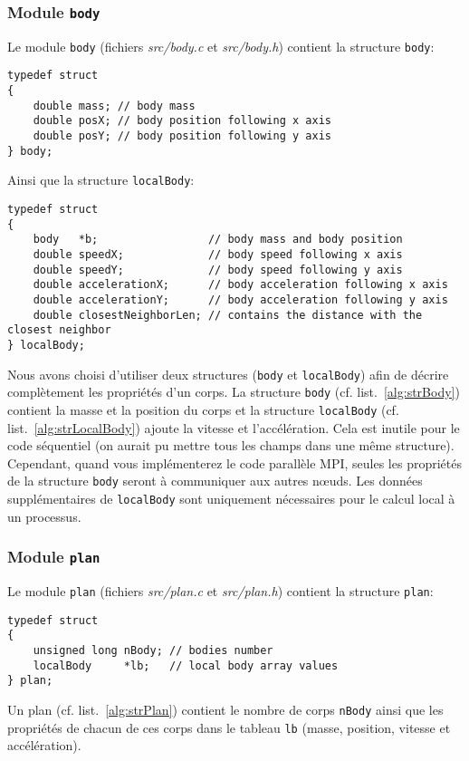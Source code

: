 \subsubsection{Module \texttt{body}}
Le module \texttt{body} (fichiers \textit{src/body.c} et \textit{src/body.h}) contient la structure \texttt{body}:
\begin{lstlisting}[caption={Structure \texttt{body}},label={alg:strBody}]
typedef struct 
{
	double mass; // body mass
	double posX; // body position following x axis
	double posY; // body position following y axis
} body;
\end{lstlisting}
Ainsi que la structure \texttt{localBody}:
\begin{lstlisting}[caption={Structure \texttt{localBody}},label={alg:strLocalBody}]
typedef struct 
{
	body   *b;                 // body mass and body position
	double speedX;             // body speed following x axis
	double speedY;             // body speed following y axis
	double accelerationX;      // body acceleration following x axis
	double accelerationY;      // body acceleration following y axis
	double closestNeighborLen; // contains the distance with the closest neighbor
} localBody;
\end{lstlisting}
Nous avons choisi d'utiliser deux structures (\texttt{body} et \texttt{localBody}) afin de décrire complètement les propriétés d'un corps.
La structure \texttt{body} (cf. list.~\ref{alg:strBody}) contient la masse et la position du corps et la structure \texttt{localBody} (cf. list.~\ref{alg:strLocalBody}) ajoute la vitesse et l'accélération.
Cela est inutile pour le code séquentiel (on aurait pu mettre tous les champs dans une même structure). 
Cependant, quand vous implémenterez le code parallèle MPI, seules les propriétés de la structure \texttt{body} seront à communiquer aux autres n\oe uds.
Les données supplémentaires de \texttt{localBody} sont uniquement nécessaires pour le calcul local à un processus.

\subsubsection{Module \texttt{plan}}
Le module \texttt{plan} (fichiers \textit{src/plan.c} et \textit{src/plan.h}) contient la structure \texttt{plan}:
\begin{lstlisting}[caption={Structure \texttt{plan}},label={alg:strPlan}]
typedef struct
{
	unsigned long nBody; // bodies number
	localBody     *lb;   // local body array values
} plan;
\end{lstlisting}
Un plan (cf. list.~\ref{alg:strPlan}) contient le nombre de corps \texttt{nBody} ainsi que les propriétés de chacun de ces corps dans le tableau \texttt{lb} (masse, position, vitesse et accélération).

